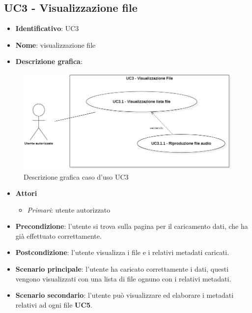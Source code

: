 
\subsection{UC3 - Visualizzazione file}
\begin{itemize}
  \item \textbf{Identificativo}: UC3
  \item \textbf{Nome}: visualizzazione file
  \item \textbf{Descrizione grafica}:
\end{itemize}

\begin{figure}[H]
  \centering
  \includegraphics[width=\textwidth]{immagini/usecase/UC3.png}
  \caption{Descrizione grafica caso d'uso UC3}
\end{figure}

\begin{itemize}
  \item \textbf{Attori}
        \begin{itemize}
          \item \textit{Primari}: utente autorizzato
        \end{itemize}
  \item \textbf{Precondizione}: l'utente si trova sulla pagina per il caricamento dati, che ha già effettuato correttamente.
  \item \textbf{Postcondizione}: l'utente visualizza i file e i relativi metadati caricati.
  \item \textbf{Scenario principale}: l'utente ha caricato correttamente i dati, questi vengono visualizzati con una lista di file ognuno con i relativi metadati.
  \item \textbf{Scenario secondario}: l'utente può visualizzare ed elaborare i metadati relativi ad ogni file \textbf{UC5}.
\end{itemize}

